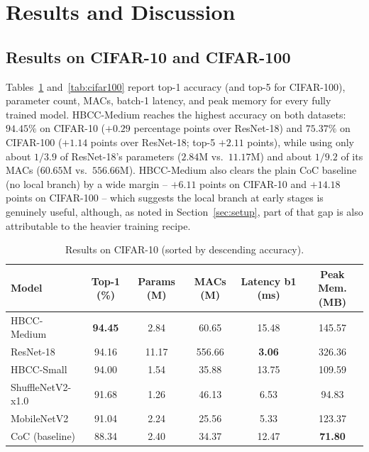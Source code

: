 \documentclass[journal]{IEEEtran}
\begin{document}
\section{Results and Discussion}
\label{sec:results}

\subsection{Results on CIFAR-10 and CIFAR-100}

Tables~\ref{tab:cifar10} and~\ref{tab:cifar100} report top-1 accuracy (and top-5 for CIFAR-100), parameter count, MACs, batch-1 latency, and peak memory for every fully trained model. HBCC-Medium reaches the highest accuracy on both datasets: $94.45\%$ on CIFAR-10 ($+0.29$ percentage points over ResNet-18) and $75.37\%$ on CIFAR-100 ($+1.14$ points over ResNet-18; top-5 $+2.11$ points), while using only about $1/3.9$ of ResNet-18's parameters ($2.84$M vs.\ $11.17$M) and about $1/9.2$ of its MACs ($60.65$M vs.\ $556.66$M). HBCC-Medium also clears the plain CoC baseline (no local branch) by a wide margin -- $+6.11$ points on CIFAR-10 and $+14.18$ points on CIFAR-100 -- which suggests the local branch at early stages is genuinely useful, although, as noted in Section~\ref{sec:setup}, part of that gap is also attributable to the heavier training recipe.

\begin{table}[t]
\centering
\caption{Results on CIFAR-10 (sorted by descending accuracy).}
\label{tab:cifar10}
\begin{tabular}{lccccc}
\toprule
\textbf{Model} & \textbf{Top-1 (\%)} & \textbf{Params (M)} & \textbf{MACs (M)} & \textbf{Latency b1 (ms)} & \textbf{Peak Mem. (MB)} \\
\midrule
HBCC-Medium & \textbf{94.45} & 2.84 & 60.65 & 15.48 & 145.57 \\
ResNet-18 & 94.16 & 11.17 & 556.66 & \textbf{3.06} & 326.36 \\
HBCC-Small & 94.00 & 1.54 & 35.88 & 13.75 & 109.59 \\
ShuffleNetV2-x1.0 & 91.68 & 1.26 & 46.13 & 6.53 & 94.83 \\
MobileNetV2 & 91.04 & 2.24 & 25.56 & 5.33 & 123.37 \\
CoC (baseline) & 88.34 & 2.40 & 34.37 & 12.47 & \textbf{71.80} \\
\bottomrule
\end{tabular}
\end{table}
\end{document}
